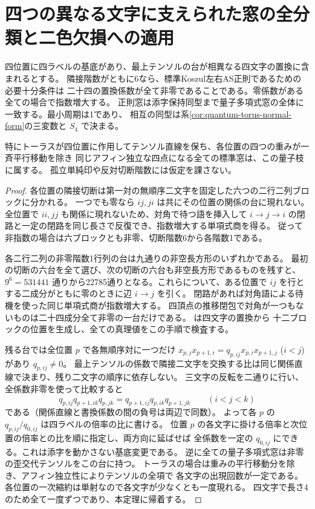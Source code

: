 \section{四つの異なる文字に支えられた窓の全分類と二色欠損への適用}
\label{sec:squarefree-window-coverage}
\begin{theorem}\label{thm:squarefree-window-coverage}
四位置に四ラベルの基底があり、最上テンソルの台が相異なる四文字の置換に含まれるとする。
隣接階数がともに6なら、標準Koszul左右AS正則であるための必要十分条件は
二十四の置換係数が全て非零であることである。零係数がある全ての場合で指数増大する。
正則窓は添字保持同型まで量子多項式窓の全体に一致する。最小周期は1であり、
相互の同型は系\ref{cor:quantum-torus-normal-form}の三変数と $S_4$ で決まる。

特にトーラスが四位置に作用してテンソル直線を保ち、各位置の四つの重みが一斉平行移動を除き
同じアフィン独立な四点になる全ての標準窓は、この量子枝に属する。
孤立単純印や反対切断階数には仮定を課さない。
\end{theorem}
\begin{proof}
各位置の隣接切断は第一対の無順序二文字を固定した六つの二行二列ブロックに分かれる。
一つでも零なら $ij,ji$ は共にその位置の関係の台に現れない。
全位置で $ii,jj$ も関係に現れないため、対角で待つ語を挿入して
$i\to j\to i$ の閉路と一定の閉路を同じ長さで反復でき、指数増大する単項式商を得る。
従って非指数の場合は六ブロックとも非零、切断階数6から各階数1である。

各二行二列の非零階数1行列の台は九通りの非空長方形のいずれかである。
最初の切断の六台を全て選び、次の切断の六台も非空長方形であるものを残すと、
$9^6=531441$ 通りから22785通りとなる。これらについて、ある位置で
$ij$ を行とする二成分がともに零のときに辺 $i\to j$ を引く。
閉路があれば対角語による待機を使った同じ単項式商が指数増大する。
四頂点の推移閉包で対角が一つもないものは二十四成分全て非零の一台だけである。
 は四文字の置換から
十二ブロックの位置を生成し、全ての真理値をこの手順で検査する。

残る台では全位置 $p$ で各無順序対に一つだけ
$x_{p,j}x_{p+1,i}=q_{p,ij}x_{p,i}x_{p+1,j}$ ($i<j$) があり $q_{p,ij}\ne0$。
最上テンソルの係数で隣接二文字を交換する比は同じ関係直線で決まり、残り二文字の順序に依存しない。
三文字の反転を二通りに行い、全係数非零を使って比較すると
\[
   q_{p,ij} q_{p+1,ik} q_{p,jk}
       =q_{p+1,ij}q_{p,ik}q_{p+1,jk}\qquad(i<j<k)
\]
である（関係直線と書換係数の間の負号は両辺で同数）。
よって各 $p$ の $q_{p,ij}/q_{0,ij}$ は四ラベルの倍率の比に書ける。
位置 $p$ の各文字に掛ける倍率と次位置の倍率との比を順に指定し、両方向に延ばせば
全係数を一定の $q_{0,ij}$ にできる。これは添字を動かさない基底変更である。
逆に全ての量子多項式窓は非零の歪交代テンソルをこの台に持つ。
トーラスの場合は重みの平行移動分を除き、アフィン独立性によりテンソルの全項で
各文字の出現回数が一定である。各位置の一次縮約は単射なので各文字が少なくとも一度現れる。
四文字で長さ4のため全て一度ずつであり、本定理に帰着する。
\end{proof}

